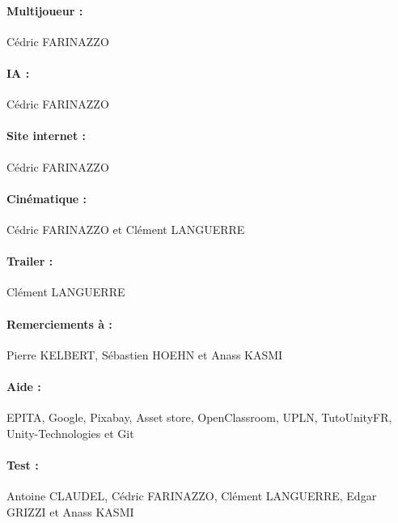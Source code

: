 \documentclass[titlepage, 13px, a4paper]{report}
\begin{document}
\paragraph*{Multijoueur : } \hspace{0pt}
Cédric FARINAZZO \\

\paragraph*{IA : } \hspace{0pt}
Cédric FARINAZZO \\

\paragraph*{Site internet : } \hspace{0pt}
Cédric FARINAZZO \\

\paragraph*{Cinématique : } \hspace{0pt}
Cédric FARINAZZO et 
Clément LANGUERRE \\

\paragraph*{Trailer : } \hspace{0pt}
Clément LANGUERRE \\

\paragraph*{Remerciements à : } \hspace{0pt}
Pierre KELBERT, 
Sébastien HOEHN et 
Anass KASMI \\

\paragraph*{Aide : } \hspace{0pt}
EPITA, 
Google, 
Pixabay, 
Asset store, 
OpenClassroom, 
UPLN, 
TutoUnityFR, 
Unity-Technologies et 
Git \\

\paragraph*{Test : } \hspace{0pt}
Antoine CLAUDEL, 
Cédric FARINAZZO, 
Clément LANGUERRE, 
Edgar GRIZZI et 
Anass KASMI \\
\end{document}
